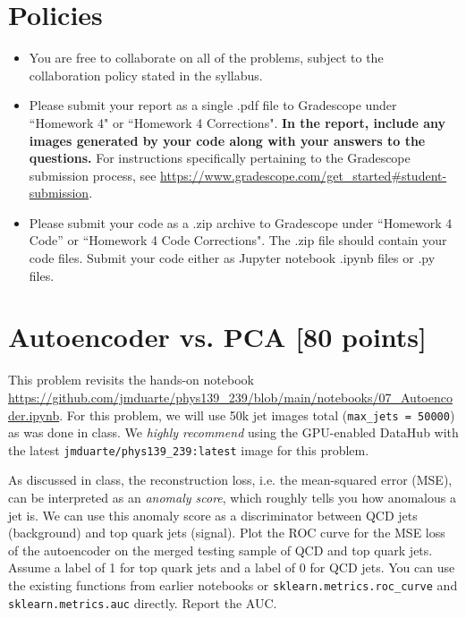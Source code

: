 \newif\ifshowsolutions
\showsolutionsfalse




\pagestyle{fancy}

\section*{Policies}
\begin{itemize}
	\item You are free to collaborate on all of the problems, subject to the collaboration policy stated in the syllabus.
	\item Please submit your report as a single .pdf file to Gradescope under ``Homework 4" or ``Homework 4 Corrections".
	      \textbf{In the report, include any images generated by your code along with your answers to the questions.}
	      For instructions specifically pertaining to the Gradescope submission process, see \url{https://www.gradescope.com/get_started#student-submission}.
	\item Please submit your code as a .zip archive to Gradescope under ``Homework 4 Code'' or ``Homework 4 Code Corrections".
	      The .zip file should contain your code files.
	      Submit your code either as Jupyter notebook .ipynb files or .py files.
\end{itemize}

\newpage
\section{Autoencoder vs. PCA [80 points]}

This problem revisits the hands-on notebook \url{https://github.com/jmduarte/phys139_239/blob/main/notebooks/07_Autoencoder.ipynb}.
For this problem, we will use 50k jet images total (\texttt{max_jets = 50000}) as was done in class.
We \emph{highly recommend} using the GPU-enabled DataHub with the latest \texttt{jmduarte/phys139_239:latest} image for this problem.

\begin{problem}[15]
As discussed in class, the reconstruction loss, i.e. the mean-squared error (MSE), can be interpreted as an \emph{anomaly score}, which roughly tells you how anomalous a jet is.
We can use this anomaly score as a discriminator between QCD jets (background) and top quark jets (signal).
Plot the ROC curve for the MSE loss of the autoencoder on the merged testing sample of QCD and top quark jets.
Assume a label of 1 for top quark jets and a label of 0 for QCD jets.
You can use the existing functions from earlier notebooks or \texttt{sklearn.metrics.roc_curve} and \texttt{sklearn.metrics.auc} directly.
Report the AUC.
\end{problem}


